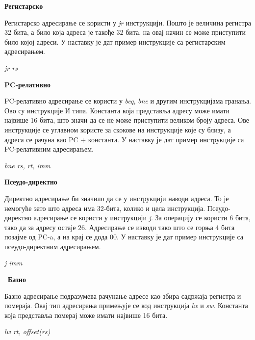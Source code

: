 \documentclass[12pt,oneside]{memoir}
\begin{document}
\begin{description}
\item \textbf{Регистарско}

Регистарско адресирање се користи у \textit{jr} инструкцији. Пошто је величина регистра 32 бита, а било која адреса је такође 32 бита, на овај начин се може приступити било којој адреси. У наставку је дат пример инструкције са регистарским адресирањем.
\begin{listing}
\centering
\textit{jr rs}
\end{listing}

\item \textbf{PC-релативно}

PC-релативно адресирање се користи у \textit{beq}, \textit{bne} и другим инструкцијама гранања. Ово су инструкције И типа. Константа која представља адресу може имати највише 16 бита, што значи да се не може приступити великом броју адреса. Ове инструкције се углавном користе за скокове на инструкције које су близу, а адреса се рачуна као PC + константа. У наставку је дат пример инструкције са PC-релативним адресирањем.
\begin{listing}
\centering
\textit{bne rs, rt, imm}
\end{listing}

\item \textbf{Псеудо-директно}

Директно адресирање би значило да се у инструкцији наводи адреса. То је немогуће зато што адреса има 32-бита, колико и цела инструкција. Псеудо-директно адресирање се користи у инструкцији \textit{j}. За операцију се користи 6 бита, тако да за адресу остаје 26. Адресирање се изводи тако што се горња 4 бита позајме од PC-a, а на крај се дода 00. У наставку је дат пример инструкције са псеудо-директним адресирањем.

\begin{listing}
\centering
\textit{j imm}
\end{listing}

\item ~\textbf{Базно}

Базно адресирање подразумева рачунање адресе као збира садржаја регистра и помераја. Овај тип адресирања примењује се код инструкција \textit{lw} и \textit{sw}. Константа која представља померај може имати највише 16 бита.

\begin{listing}
\centering
\textit{lw rt, offset(rs)}
\end{listing}

\end{description}
\end{document}
